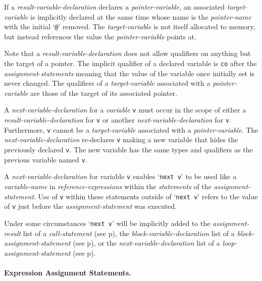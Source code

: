 \documentclass[12pt]{article}
\newcommand{\subsubsubsection}[1]{\paragraph[#1]{#1.}}
\newcommand{\pagref}[1]{p\pageref{#1}}
\begin{document}
If a {\em result-variable-declaration} declares a {\em pointer-variable},
an associated {\em target-variable} is implicitly declared at the same time
whose name is the {\em pointer-name} with the initial `{\tt @}' removed.
The {\em target-variable} is not itself allocated to memory,
but instead references the value the {\em pointer-variable}
points at.

Note that a {\em result-variable-declaration} does not allow
qualifiers on anything but the target of a pointer.  The implicit
qualifier of a declared variable is {\tt co} after the
{\em assignment-statements} meaning that
the value of the variable once initially set is never changed.
The qualifiers of a {\em target-variable} associated with a
{\em pointer-variable} are those of the target of
its associated pointer.

A {\em next-variable-declaration} for a {\em variable} {\tt v}
must occur in the scope of either a {\em result-variable-declaration}
for {\tt v} or another {\em next-variable-declaration} for {\tt v}.
Furthermore, {\tt v} cannot be a {\em target-variable} associated
with a {\em pointer-variable}.
The {\em next-variable-declaration} re-declares {\tt v} making a new
variable that hides the previously declared {\tt v}.  The new variable
has the same types and qualifiers as the previous variable named {\tt v}.

A {\em next-variable-declaration} for variable {\tt v} enables
`{\tt next v}' to be used like a {\em variable-name}
in {\em reference-expressions} within the {\em statements}
of the {\em assignment-statement}.  Use of
{\tt v} within these statements outside of `{\tt next v}'
refers to the value of {\tt v} just
before the {\em assignment-statement} was executed.

Under some circumstances `{\tt next v}' will
be implicitly added to the {\em assignment-result}
list of a {\em call-statement} (see \pagref{CALL-NEXT-PROMOTION}),
the {\em block-variable-declaration} list
of a {\em block-assignment-statement} (see \pagref{BLOCK-NEXT-PROMOTION}),
or the {\em next-variable-declaration} list of a
{\em loop-assignment-statement} (see \pagref{LOOP-NEXT-PROMOTION}).

\subsubsubsection{Expression Assignment Statements}
\label{EXPRESSION-ASSIGNMENT-STATEMENTS}
\end{document}
